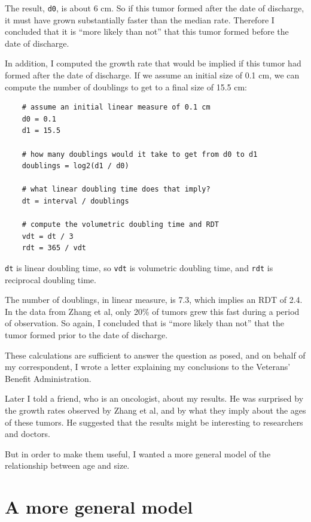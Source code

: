 \documentclass[12pt]{book}
\begin{document}
The result, {\tt d0}, is about 6 cm.  So if this tumor formed after
the date of discharge, it must have grown substantially faster than
the median rate.  Therefore I concluded that it is ``more likely than
not'' that this tumor formed before the date of discharge.

In addition, I computed the growth rate that would be implied
if this tumor had formed after the date of discharge.  If we
assume an initial size of 0.1 cm, we can compute the number of
doublings to get to a final size of 15.5 cm:

\begin{verbatim}
    # assume an initial linear measure of 0.1 cm
    d0 = 0.1
    d1 = 15.5

    # how many doublings would it take to get from d0 to d1
    doublings = log2(d1 / d0)

    # what linear doubling time does that imply?
    dt = interval / doublings

    # compute the volumetric doubling time and RDT
    vdt = dt / 3
    rdt = 365 / vdt
\end{verbatim}

{\tt dt} is linear doubling time, so {\tt vdt} is volumetric
doubling time, and {\tt rdt} is reciprocal doubling
time.

The number of doublings, in linear measure, is 7.3, which implies
an RDT of 2.4.  In the data from Zhang et al, only 20\% of tumors
grew this fast during a period of observation.  So again,
I concluded that is ``more likely than not'' that the tumor
formed prior to the date of discharge.

These calculations are sufficient to answer the question as
posed, and on behalf of my correspondent, I wrote a letter explaining
my conclusions to the Veterans' Benefit Administration.

Later I told a friend, who is an oncologist, about my results.  He was
surprised by the growth rates observed by Zhang et al, and by what
they imply about the ages of these tumors.  He suggested that the
results might be interesting to researchers and doctors.

But in order to make them useful, I wanted a more general model
of the relationship between age and size.


\section{A more general model}
\end{document}
